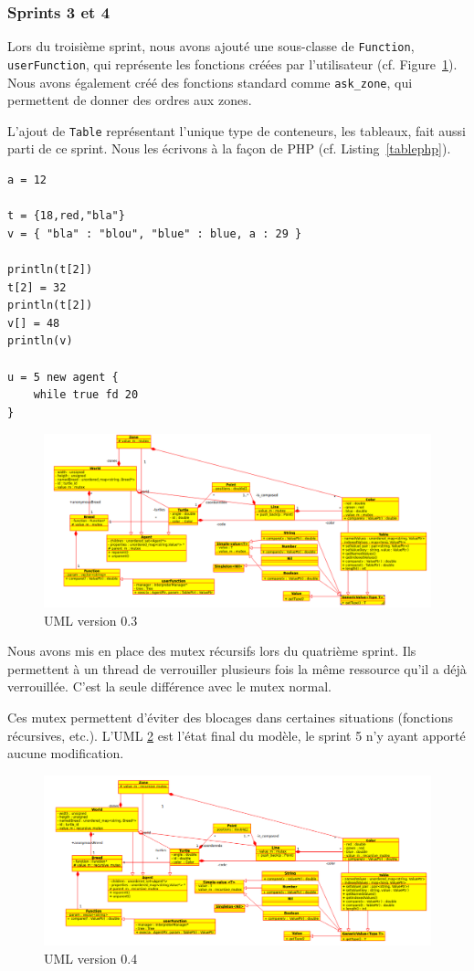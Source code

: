 \subsubsection{Sprints 3 et 4}
Lors du troisième sprint, nous avons ajouté une sous-classe de \verb|Function|, \verb|userFunction|, qui représente les fonctions créées par l'utilisateur (cf. Figure~\ref{v0.3}). Nous avons également créé des fonctions standard comme \verb|ask_zone|, qui permettent de donner des ordres aux zones.

L'ajout de \verb|Table| représentant l'unique type de conteneurs, les tableaux, fait aussi parti de ce sprint.
Nous les écrivons à la façon de PHP (cf. Listing~\ref{tablephp}).
\begin{lstlisting}[label=tablephp,caption=Syntaxe des tables en Stibbons]
a = 12

t = {18,red,"bla"}
v = { "bla" : "blou", "blue" : blue, a : 29 }

println(t[2])
t[2] = 32
println(t[2])
v[] = 48
println(v)

u = 5 new agent {
	while true fd 20
}
\end{lstlisting}

\begin{figure}[h]
\includegraphics[scale=0.4]{doc/report/uml/v03.png}
\caption{\label{v0.3} UML version 0.3}
\end{figure}

Nous avons mis en place des mutex récursifs lors du quatrième sprint. Ils permettent à un thread de verrouiller plusieurs fois la même ressource qu'il a déjà verrouillée. C'est la seule différence avec le mutex normal. 

Ces mutex permettent d'éviter des blocages dans certaines situations (fonctions récursives, etc.).
L'UML \ref{v0.4} est l'état final du modèle, le sprint 5 n'y ayant apporté aucune modification.
\begin{figure}[h]
\includegraphics[scale=0.4]{doc/report/uml/v04.png}
\caption{\label{v0.4} UML version 0.4}
\end{figure}

